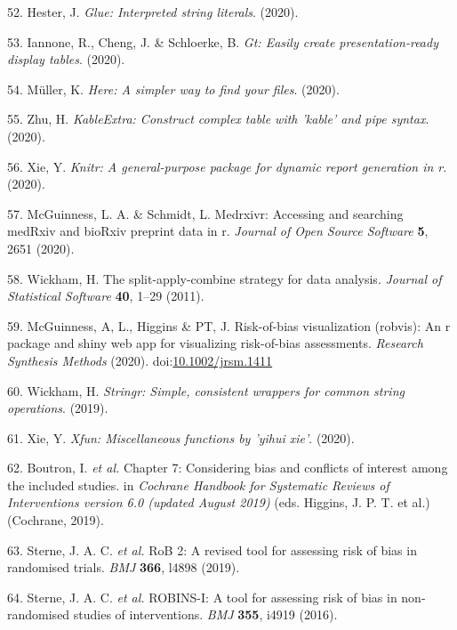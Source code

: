 \documentclass[a4paper, twoside]{templates/ociamthesis}
\begin{document}
\leavevmode\hypertarget{ref-glue}{}%
52. Hester, J. \emph{Glue: Interpreted string literals}. (2020).

\leavevmode\hypertarget{ref-gt}{}%
53. Iannone, R., Cheng, J. \& Schloerke, B. \emph{Gt: Easily create presentation-ready display tables}. (2020).

\leavevmode\hypertarget{ref-here}{}%
54. Müller, K. \emph{Here: A simpler way to find your files}. (2020).

\leavevmode\hypertarget{ref-kableExtra}{}%
55. Zhu, H. \emph{KableExtra: Construct complex table with 'kable' and pipe syntax}. (2020).

\leavevmode\hypertarget{ref-knitr}{}%
56. Xie, Y. \emph{Knitr: A general-purpose package for dynamic report generation in r}. (2020).

\leavevmode\hypertarget{ref-medrxivr}{}%
57. McGuinness, L. A. \& Schmidt, L. Medrxivr: Accessing and searching medRxiv and bioRxiv preprint data in r. \emph{Journal of Open Source Software} \textbf{5}, 2651 (2020).

\leavevmode\hypertarget{ref-plyr}{}%
58. Wickham, H. The split-apply-combine strategy for data analysis. \emph{Journal of Statistical Software} \textbf{40}, 1--29 (2011).

\leavevmode\hypertarget{ref-robvis}{}%
59. McGuinness, A, L., Higgins \& PT, J. Risk-of-bias visualization (robvis): An r package and shiny web app for visualizing risk-of-bias assessments. \emph{Research Synthesis Methods} (2020). doi:\href{https://doi.org/10.1002/jrsm.1411}{10.1002/jrsm.1411}

\leavevmode\hypertarget{ref-stringr}{}%
60. Wickham, H. \emph{Stringr: Simple, consistent wrappers for common string operations}. (2019).

\leavevmode\hypertarget{ref-xfun}{}%
61. Xie, Y. \emph{Xfun: Miscellaneous functions by 'yihui xie'}. (2020).

\leavevmode\hypertarget{ref-cochranechpt7}{}%
62. Boutron, I. \emph{et al.} Chapter 7: Considering bias and conflicts of interest among the included studies. in \emph{Cochrane Handbook for Systematic Reviews of Interventions version 6.0 (updated August 2019)} (eds. Higgins, J. P. T. et al.) (Cochrane, 2019).

\leavevmode\hypertarget{ref-sterne2019rob}{}%
63. Sterne, J. A. C. \emph{et al.} RoB 2: A revised tool for assessing risk of bias in randomised trials. \emph{BMJ} \textbf{366}, l4898 (2019).

\leavevmode\hypertarget{ref-sterne2016robins}{}%
64. Sterne, J. A. C. \emph{et al.} ROBINS-I: A tool for assessing risk of bias in non-randomised studies of interventions. \emph{BMJ} \textbf{355}, i4919 (2016).
\end{document}
